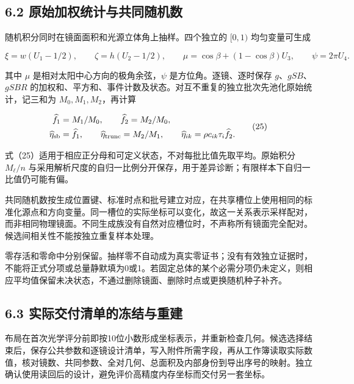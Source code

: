 \documentclass[UTF8,fontset=windows,zihao=-4]{ctexart}
\begin{document}
\subsection*{6.2 原始加权统计与共同随机数}

\par\noindent\begin{minipage}{\linewidth}
随机积分同时在镜面面积和光源立体角上抽样。四个独立的 \([0,1)\) 均匀变量可生成

\[
\xi=w(U_1-1/2),\qquad\zeta=h(U_2-1/2),\qquad
\mu=\cos\beta+(1-\cos\beta)U_3,\qquad
\psi=2\pi U_4.
\tag{24}
\]
\end{minipage}\par

\par\noindent\begin{minipage}{\linewidth}
其中 \(\mu\) 是相对太阳中心方向的极角余弦，\(\psi\) 是方位角。逐镜、逐时保存 \(g\)、\(gSB\)、\(gSBR\) 的加权和、平方和、事件计数及状态。对互不重复的独立批次先池化原始统计，记三和为 \(M_0,M_1,M_2\)，再计算

\[
\begin{aligned}
\widehat f_1&=M_1/M_0,\qquad\widehat f_2=M_2/M_0,\\
\widehat\eta_{\rm sb}&=\widehat f_1,\qquad
\widehat\eta_{\rm trunc}=M_2/M_1,\qquad
\widehat\eta_{ik}=\rho c_{ik}\tau_i\widehat f_2.
\end{aligned}
\tag{25}
\]
\end{minipage}\par

式（25）适用于相应正分母和可定义状态，不对每批比值先取平均。原始积分 \(M_\ell/n\) 与采用解析尺度的自归一比例分开保存，用于差异诊断；有限样本下自归一比值仍可能有偏。

共同随机数按生成位置键、标准时点和批号建立对应，在共享槽位上使用相同的标准化源点和方向变量。同一槽位的实际坐标可以变化，故这一关系表示采样配对，而非相同物理镜面。不同生成族没有自然对应槽位时，不声称所有镜面完全配对。候选间相关性不能按独立重复样本处理。

零存活和零命中分别保留。抽样零不自动成为真实零证书；没有有效独立证据时，不能将正式分项或总量静默填为0或1。若固定总体的某个必需分项仍未定义，则相应平均值保留未决状态，不通过删除镜面、删除时点或更换随机种子补齐。

\subsection*{6.3 实际交付清单的冻结与重建}

布局在首次光学评分前即按10位小数形成坐标表示，并重新检查几何。候选选择结束后，保存公共参数和逐镜设计清单，写入附件所需字段，再从工作簿读取实际数值，核对镜数、共同参数、全对几何、总面积及内部身份到导出序号的映射。独立确认使用读回后的设计，避免评价高精度内存坐标而交付另一套坐标。
\end{document}
